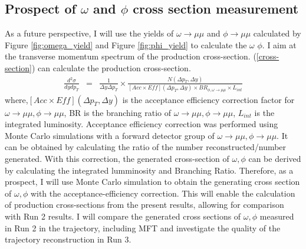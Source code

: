     \subsection{Prospect of $\omega$ and $\phi$ cross section measurement}
        As a future perspective, I will use the yields of $\omega \rightarrow\mu\mu$ and $\phi \rightarrow\mu\mu$ calculated by Figure \ref{fig:omega_yield} and Figure \ref{fig:phi_yield} to calculate the $\omega$ $\phi$. I aim at the transverse momentum spectrum of the production cross-section.
        (\ref{cross-section}) can calculate the production cross-section\cite{phi-crosssection}.
        \begin{eqnarray}
            \frac{d^2\sigma}{dy dp_T} &=& \frac{1}{\Delta y \Delta p_T}\times \frac{N(\Delta p_T,\Delta y)}{[Acc\times Eff](\Delta p_T,\Delta y)\times BR_{\phi,\omega\rightarrow\mu\mu}\times L_{int}}
            \label{cross-section}
        \end{eqnarray}
        where,$[Acc \times Eff](\Delta p_T,\Delta y)$ is the acceptance efficiency correction factor for $\omega \rightarrow \mu\mu,\phi \rightarrow \mu\mu$, BR is the branching ratio of $\omega\rightarrow\mu\mu,\phi\rightarrow\mu\mu$, $L_{int}$ is the integrated luminosity.
        Acceptance efficiency correction was performed using Monte Carlo simulations with a forward detector group of $\omega\rightarrow\mu\mu,\phi\rightarrow\mu\mu$.
        It can be obtained by calculating the ratio of the number reconstructed/number generated. With this correction, the generated cross-section of $\omega,\phi$ can be derived by calculating the integrated lumminosity and Branching Ratio. Therefore, as a prospect, I will use Monte Carlo simulation to obtain the generating cross section of $\omega,\phi$ with the acceptance-efficiency correction.
        This will enable the calculation of production cross-sections from the present results, allowing for comparison with Run 2 results. I will compare the generated cross sections of $\omega,\phi$ measured in Run 2 in the trajectory, including MFT and investigate the quality of the trajectory reconstruction in Run 3.

